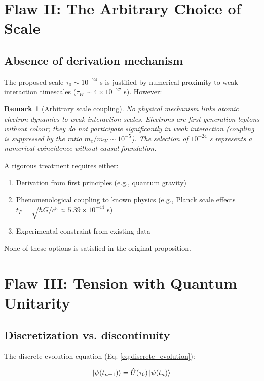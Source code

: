 \documentclass[11pt,a4paper]{article}
\newtheorem{remark}{Remark}
\begin{document}
\section{Flaw II: The Arbitrary Choice of Scale}

\subsection{Absence of derivation mechanism}

The proposed scale $\tau_0 \sim 10^{-24}$ s is justified by numerical proximity to weak interaction timescales ($\tau_W \sim 4 \times 10^{-27}$ s). However:

\begin{remark}[Arbitrary scale coupling]
No physical mechanism links atomic electron dynamics to weak interaction scales. Electrons are first-generation leptons without colour; they do not participate significantly in weak interaction (coupling is suppressed by the ratio $m_e/m_W \sim 10^{-5}$). The selection of $10^{-24}$ s represents a \textit{numerical coincidence without causal foundation}.
\end{remark}

A rigorous treatment requires either:
\begin{enumerate}[label=(\alph*)]
    \item Derivation from first principles (e.g., quantum gravity)
    \item Phenomenological coupling to known physics (e.g., Planck scale effects $t_P = \sqrt{\hbar G/c^5} \approx 5.39 \times 10^{-44}$ s)
    \item Experimental constraint from existing data
\end{enumerate}
None of these options is satisfied in the original proposition.

\section{Flaw III: Tension with Quantum Unitarity}

\subsection{Discretization vs. discontinuity}

The discrete evolution equation (Eq. \ref{eq:discrete_evolution}):

\begin{equation}
\ket{\psi(t_{n+1})} = \hat{U}(\tau_0)\ket{\psi(t_n)}
\end{equation}
\end{document}
